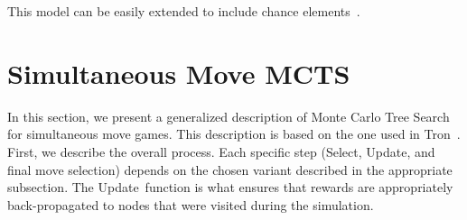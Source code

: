 \documentclass[conference]{IEEEtran}
\newcommand{\cT}{\mathcal{T}}
\newcommand{\ie}{{\it i.e.,}~}
\begin{document}

This model can be easily extended to include chance elements~\cite{Lanctot13Goofspiel}. 

\section{Simultaneous Move MCTS}
\label{sec:smmcts}

\newcommand{\SMMCTS}{{\sc SM-MCTS}}
\newcommand{\ExpReq}{{\sc ExpansionRequired}}
\newcommand{\Update}{{\sc Update}}
\newcommand{\Select}{{\sc Select}}
\newcommand{\Playout}{{\sc Playout}}
\newcommand{\Max}{\text{Max}}
\newcommand{\Min}{\text{Min}}


In this section, we present a generalized description of Monte Carlo Tree Search for simultaneous move games. This 
description is based on the one used in Tron~\cite{Perick12Comparison}. First, we describe the overall process. 
Each specific step (\Select, \Update, and final move selection) depends on the chosen variant described in the 
appropriate subsection. The \Update~function is what ensures that rewards are appropriately back-propagated 
to nodes that were visited during the simulation. 
\end{document}
